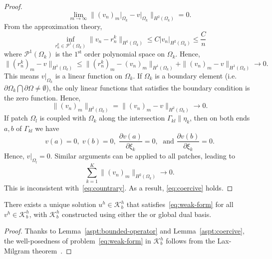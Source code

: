 \begin{lemma}
\begin{proof}
    \begin{equation}
      \lim_{m\to\infty}\| (v_n)_m \vert_{\Omega_k} -v \vert_{\Omega_k}\|_{H^2(\Omega_k)}=0.
    \end{equation}
    From the approximation theory,
    \begin{equation}
      \inf_{r^k_n\in\mathcal{P}^1(\Omega_k)}\|v_{n}-r^k_n\|_{H^1(\Omega_k)}\leq C \vert v_{n} \vert_{H^2(\Omega_k)} \leq \frac{C}{n}
    \end{equation}
    where $\mathcal{P}^1(\Omega_k)$ is the $1^\text{st}$ order polynomial space on $\Omega_k$. Hence,
    \begin{equation}
      \| (r^k_n)_m-v\|_{H^1(\Omega_k)} \leq \| (r^k_n)_m-(v_n)_m\|_{H^1(\Omega_k)}+\| (v_n)_m-v\|_{H^1(\Omega_k)} \rightarrow 0.
    \end{equation}
    This means $v\vert_{\Omega_k}$ is a linear function on $\Omega_k$. If $\Omega_k$ is a boundary element (i.e. $\partial \Omega_k\bigcap \partial\Omega\neq\emptyset$), the only linear functions that satisfies the boundary condition is the zero function. Hence,
    \begin{equation}
      \|(v_{n})_m\|_{H^2(\Omega_k)}=\|(v_{n})_m-v\|_{H^2(\Omega_k)}\rightarrow 0.
    \end{equation}
    If patch $\Omega_l$ is coupled with $\Omega_k$ along the intersection $\Gamma_{kl}\parallel \eta_k$, then on both ends $a,b$ of $\Gamma_{kl}$ we have
    \begin{equation}
      v(a) = 0,\; v(b) = 0,\; \frac{\partial v(a)}{\partial \xi_k} = 0,\;\text{ and }\frac{\partial v(b)}{\partial \xi_k} = 0.\label{eq:boundary_conditions}
    \end{equation}
    Hence, $v\vert_{\Omega_l}=0$. Similar arguments can be applied to all patches, leading to
    \begin{equation}
      \sum_{k=1}^K\| (v_n)_m \|_{H^2(\Omega_k)}\rightarrow 0.
    \end{equation}
    This is inconsistent with~\eqref{eq:countrary}. As a result, \eqref{eq:coercive} holds.
  \end{proof}
\end{lemma}

\begin{theorem}
  There exists a unique solution $u^h\in{\mathcal{K}_b^h}$ that satisfies~\eqref{eq:weak-form} for all $v^h\in{\mathcal{K}_b^h}$, with $\mathcal{K}_b^h$ constructed using either the \Bezier or global dual basis.
  \begin{proof}
    Thanks to Lemma~\ref{aspt:bounded-operator} and Lemma~\ref{aspt:coercive}, the well-posedness of problem~\eqref{eq:weak-form} in $\mathcal{K}_b^h$ follows from the Lax-Milgram theorem~\cite{brenner_mathematical_2007}.\par
  \end{proof}
\end{theorem}

